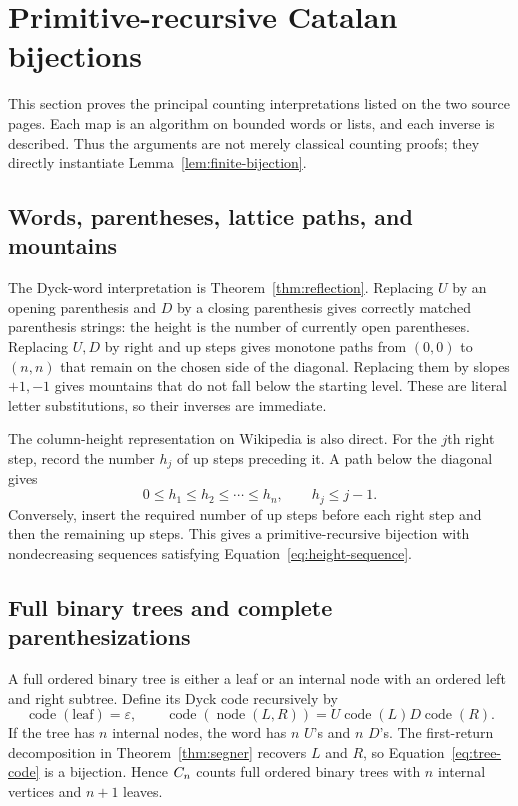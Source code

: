 \section{Primitive-recursive Catalan bijections}
\label{sec:combinatorics}

This section proves the principal counting interpretations listed on the two
source pages.  Each map is an algorithm on bounded words or lists, and each
inverse is described.  Thus the arguments are not merely classical counting
proofs; they directly instantiate Lemma~\ref{lem:finite-bijection}.

\subsection{Words, parentheses, lattice paths, and mountains}

The Dyck-word interpretation is Theorem~\ref{thm:reflection}.  Replacing $U$
by an opening parenthesis and $D$ by a closing parenthesis gives correctly
matched parenthesis strings: the height is the number of currently open
parentheses.  Replacing $U,D$ by right and up steps gives monotone paths from
$(0,0)$ to $(n,n)$ that remain on the chosen side of the diagonal.  Replacing
them by slopes $+1,-1$ gives mountains that do not fall below the starting
level.  These are literal letter substitutions, so their inverses are
immediate.

The column-height representation on Wikipedia is also direct.  For the
$j$th right step, record the number $h_j$ of up steps preceding it.  A path
below the diagonal gives
\[
 0\le h_1\le h_2\le\cdots\le h_n,
 \qquad h_j\le j-1.
\tag{3.1}\label{eq:height-sequence}
\]
Conversely, insert the required number of up steps before each right step and
then the remaining up steps.  This gives a primitive-recursive bijection with
nondecreasing sequences satisfying Equation~\eqref{eq:height-sequence}.

\subsection{Full binary trees and complete parenthesizations}

A full ordered binary tree is either a leaf or an internal node with an ordered
left and right subtree.  Define its Dyck code recursively by
\[
 \operatorname{code}(\text{leaf})=\varepsilon,
 \qquad
 \operatorname{code}(\operatorname{node}(L,R))
   =U\operatorname{code}(L)D\operatorname{code}(R).              \tag{3.2}\label{eq:tree-code}
\]
If the tree has $n$ internal nodes, the word has $n$ $U$'s and $n$ $D$'s.
The first-return decomposition in Theorem~\ref{thm:segner} recovers $L$ and
$R$, so Equation~\eqref{eq:tree-code} is a bijection.  Hence $C_n$ counts full
ordered binary trees with $n$ internal vertices and $n+1$ leaves.

